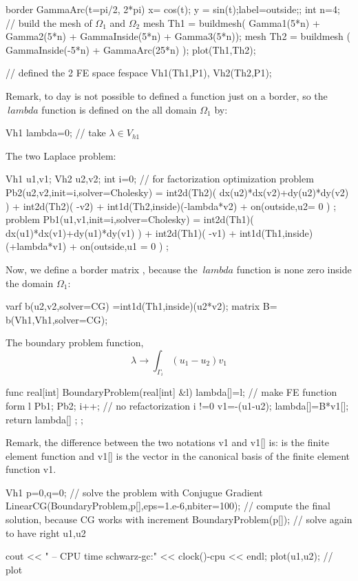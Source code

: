 \documentclass[twoside]{book}
\begin{document}
border GammaArc(t=pi/2, 2*pi){ x= cos(t); y = sin(t);label=outside;}; 
int n=4;
//  build the mesh of $\Omega_1$ and $\Omega_2$
mesh Th1 = buildmesh( Gamma1(5*n) + Gamma2(5*n) + GammaInside(5*n) + Gamma3(5*n));
mesh Th2 = buildmesh ( GammaInside(-5*n) + GammaArc(25*n) );
plot(Th1,Th2);

// defined the 2 FE space
fespace Vh1(Th1,P1),      Vh2(Th2,P1);
\eFF

Remark, to day is not possible to
defined a function just on a border, so the $\ lambda $
function is defined on the all domain $\Omega_1$
by:

\bFF

Vh1 lambda=0;  // take $\lambda \in V_{h1}$
\eFF

The two Laplace problem:
\bFF

Vh1 u1,v1;              Vh2 u2,v2;
int i=0;  // for factorization optimization 
problem Pb2(u2,v2,init=i,solver=Cholesky) = 
    int2d(Th2)( dx(u2)*dx(v2)+dy(u2)*dy(v2) )
  + int2d(Th2)( -v2) 
  + int1d(Th2,inside)(-lambda*v2) +    on(outside,u2= 0 ) ;
problem Pb1(u1,v1,init=i,solver=Cholesky) = 
    int2d(Th1)( dx(u1)*dx(v1)+dy(u1)*dy(v1) )
  + int2d(Th1)( -v1) 
  + int1d(Th1,inside)(+lambda*v1) +    on(outside,u1 = 0 ) ;
\eFF

Now, we define a border matrix , because the
 $\ lambda $ function is none zero inside the domain $\Omega_1$:
\bFF

varf b(u2,v2,solver=CG) =int1d(Th1,inside)(u2*v2);
matrix B= b(Vh1,Vh1,solver=CG);
\eFF

The boundary problem function,
  $$
  \lambda \longrightarrow  \int_{\Gamma_i }(u_1-u_2) v_{1}
$$
\bFF

func real[int] BoundaryProblem(real[int] &l)
{ 
   lambda[]=l; // make FE function form l
   Pb1;     Pb2;
   i++;  //  no  refactorization i !=0
   v1=-(u1-u2); 
   lambda[]=B*v1[];
   return lambda[] ;
};
\eFF

Remark, the  difference between the two notations v1 and v1[]  is: 
  is the finite element  function and v1[] 
is the vector in the canonical basis of the   finite element  function  v1.
\index{[]\verb=[]=}
 
\bFF

Vh1 p=0,q=0; 
//  solve the problem with Conjugue Gradient
LinearCG(BoundaryProblem,p[],eps=1.e-6,nbiter=100);
//  compute the final solution, because CG works with increment
BoundaryProblem(p[]); // solve again  to have right u1,u2

cout << " -- CPU time  schwarz-gc:" <<  clock()-cpu << endl;
plot(u1,u2); // plot 
\eFF
\end{document}
